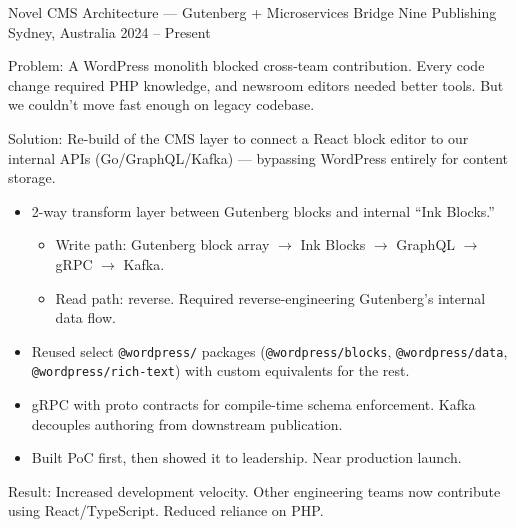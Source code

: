 

\begin{cventries}

  \cventry
    {Novel CMS Architecture --- Gutenberg + Microservices Bridge} %
    {Nine Publishing} %
    {Sydney, Australia} %
    {2024 -- Present} %
    {
      \begin{cvitems}
        \item {Problem: A WordPress monolith blocked cross-team contribution. Every code change required PHP knowledge, and newsroom editors needed better tools. But we couldn't move fast enough on legacy codebase.}
        \item {Solution: Re-build of the CMS layer to connect a React block editor to our internal APIs (Go/GraphQL/Kafka) --- bypassing WordPress entirely for content storage.}
            \begin{itemize}
                \item {2-way transform layer between Gutenberg blocks and internal ``Ink Blocks.''}
                    \begin{itemize}
                        \item {Write path: Gutenberg block array $\rightarrow$ Ink Blocks $\rightarrow$ GraphQL $\rightarrow$ gRPC $\rightarrow$ Kafka.}
                        \item {Read path: reverse. Required reverse-engineering Gutenberg's internal data flow.}
                    \end{itemize}
                \item {Reused select \texttt{@wordpress/} packages (\texttt{@wordpress/blocks}, \texttt{@wordpress/data}, \texttt{@wordpress/rich-text}) with custom equivalents for the rest.}
                \item {gRPC with proto contracts for compile-time schema enforcement. Kafka decouples authoring from downstream publication.}
                \item {Built PoC first, then showed it to leadership. Near production launch.}
            \end{itemize}
        \item {Result: Increased development velocity. Other engineering teams now contribute using React/TypeScript. Reduced reliance on PHP.}
      \end{cvitems}
    }


\end{cventries}
